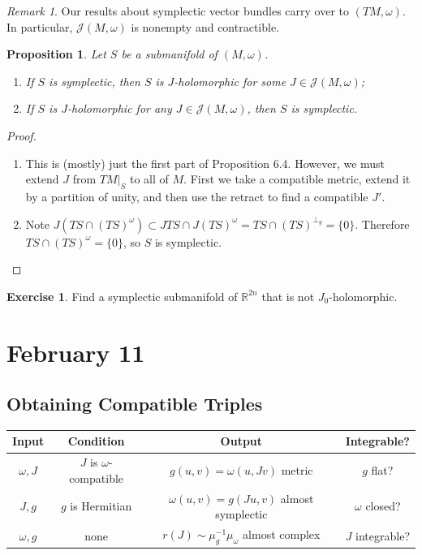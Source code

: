 \documentclass[leqno, openany]{memoir}
\newtheorem{prop}[thm]{Proposition}
\theoremstyle{definition}
\newtheorem{exer}[thm]{Exercise}
\theoremstyle{remark}
\newtheorem{rmk}[thm]{Remark}
\theoremstyle{plain}
\theoremstyle{definition}
\theoremstyle{remark}
\newcommand{\R}{\mathbb{R}}
\newcommand{\mc}[1]{\mathcal{#1}}
\begin{document}
\begin{rmk}
    Our results about symplectic vector bundles carry over to $(TM, \omega)$. In particular, $\mc{J}(M, \omega)$ is nonempty and contractible. 
\end{rmk}

\begin{prop}
    Let $S$ be a submanifold of $(M, \omega)$. 
    \begin{enumerate}
        \item If $S$ is symplectic, then $S$ is $J$-holomorphic for some $J \in \mc{J}(M, \omega)$;
        \item If $S$ is $J$-holomorphic for any $J \in \mc{J}(M, \omega)$, then $S$ is symplectic.
    \end{enumerate}
\end{prop}

\begin{proof}
    \begin{enumerate}
        \item This is (mostly) just the first part of Proposition 6.4. However, we must extend $J$ from $TM|_S$ to all of $M$. First we take a compatible metric, extend it by a partition of unity, and then use the retract to find a compatible $J'$.
        \item Note $J(TS \cap (TS)^{\omega}) \subset JTS \cap J(TS)^{\omega} = TS \cap (TS)^{\perp_g} = \{0\}$. Therefore $TS \cap (TS)^{\omega} = \{0\}$, so $S$ is symplectic.
    \end{enumerate}
\end{proof}

\begin{exer}
    Find a symplectic submanifold of $\R^{2n}$ that is not $J_0$-holomorphic.
\end{exer}

\chapter{February 11}%
\label{cha:february_11}

\section{Obtaining Compatible Triples}%
\label{sec:obtaining_compatible_triples}

\begin{center}
    \begin{tabular}{cccc}
        \toprule
        Input & Condition & Output & Integrable? \\
        \midrule
        $\omega, J$ & $J$ is $\omega$-compatible  & $g(u,v) = \omega(u, Jv)$ metric & $g$ flat? \\
        $J, g$ & $g$ is Hermitian & $\omega(u,v) = g(Ju,v)$ almost symplectic & $\omega$ closed? \\
        $\omega, g$ & none & $r(J) \sim \mu_g^{-1} \mu_{\omega}$ almost complex & $J$ integrable? \\
        \bottomrule
    \end{tabular}
\end{center}
\end{document}
